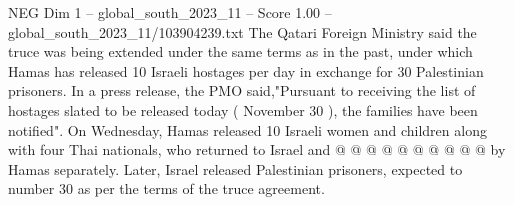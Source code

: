 \begin{textsample}{NEG Dim 1 – global\_south\_2023\_11 – Score 1.00 – global\_south\_2023\_11/103904239.txt}
The Qatari Foreign Ministry said the truce was being extended under the same terms as in the past, under which Hamas has released 10 Israeli hostages per day in exchange for 30 Palestinian prisoners.
In a press release, the PMO said,"Pursuant to receiving the list of hostages slated to be released today ( November 30 ), the families have been notified".
On Wednesday, Hamas released 10 Israeli women and children along with four Thai nationals, who returned to Israel and @ @ @ @ @ @ @ @ @ @ by Hamas separately.
Later, Israel released Palestinian prisoners, expected to number 30 as per the terms of the truce agreement.

\end{textsample}
